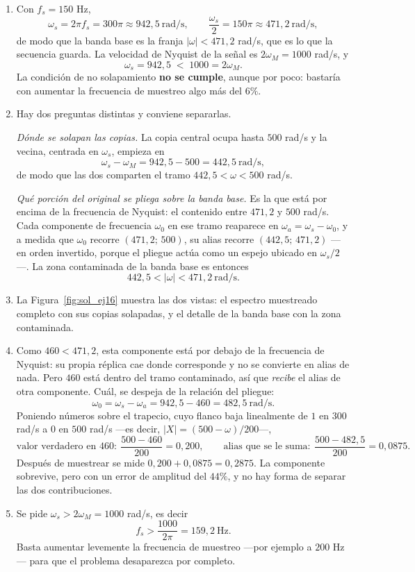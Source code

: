 \documentclass[10pt,a4paper]{article}
\begin{document}
	\begin{enumerate}
		\item Con $f_s = 150$ Hz,
		\[
			\omega_s = 2\pi f_s = 300\pi \approx 942{,}5 \ \text{rad/s},
			\qquad
			\frac{\omega_s}{2} = 150\pi \approx 471{,}2\ \text{rad/s},
		\]
		de modo que la banda base es la franja $|\omega| < 471{,}2$ rad/s, que es lo que la
		secuencia guarda. La velocidad de Nyquist de la señal es $2\omega_M = 1000$ rad/s, y
		\[
			\omega_s = 942{,}5 \;<\; 1000 = 2\omega_M .
		\]
		La condición de no solapamiento \textbf{no se cumple}, aunque por poco: bastaría con
		aumentar la frecuencia de muestreo algo más del $6\%$.

		\item Hay dos preguntas distintas y conviene
		separarlas.

		\emph{Dónde se solapan las copias.} La copia central ocupa hasta $500$ rad/s y la
		vecina, centrada en $\omega_s$, empieza en
		\[
			\omega_s - \omega_M = 942{,}5 - 500 = 442{,}5 \ \text{rad/s},
		\]
		de modo que las dos comparten el tramo $442{,}5 < \omega < 500$ rad/s.

		\emph{Qué porción del original se pliega sobre la banda base.} Es la que está por
		encima de la frecuencia de Nyquist: el contenido entre $471{,}2$ y $500$ rad/s. Cada
		componente de frecuencia $\omega_0$ en ese tramo reaparece en
		$\omega_a = \omega_s - \omega_0$, y a medida que $\omega_0$ recorre $(471{,}2;\,500)$,
		su alias recorre $(442{,}5;\,471{,}2)$ ---en orden invertido, porque el pliegue actúa
		como un espejo ubicado en $\omega_s/2$---. La zona contaminada de la banda base es
		entonces
		\[
			\boxed{\;442{,}5 < |\omega| < 471{,}2 \ \text{rad/s}.\;}
		\]

		\item La Figura~\ref{fig:sol_ej16} muestra las dos vistas: el
		espectro muestreado completo con sus copias solapadas, y el detalle de la banda base
		con la zona contaminada.

		\item Como $460 < 471{,}2$, esta
		componente está por debajo de la frecuencia de Nyquist: su propia réplica cae donde
		corresponde y no se convierte en alias de nada. Pero $460$ está dentro del tramo
		contaminado, así que \emph{recibe} el alias de otra componente. Cuál, se despeja de la
		relación del pliegue:
		\[
			\omega_0 = \omega_s - \omega_a = 942{,}5 - 460 = 482{,}5\ \text{rad/s}.
		\]
		Poniendo números sobre el trapecio, cuyo flanco baja linealmente de $1$ en $300$ rad/s
		a $0$ en $500$ rad/s ---es decir, $|X| = (500-\omega)/200$---,
		\[
			\text{valor verdadero en } 460: \ \frac{500-460}{200}=0{,}200,
			\qquad
			\text{alias que se le suma}: \ \frac{500-482{,}5}{200}=0{,}0875 .
		\]
		Después de muestrear se mide $0{,}200+0{,}0875 = 0{,}2875$. La componente sobrevive,
		pero con un error de amplitud del $44\%$, y no hay forma de separar las dos
		contribuciones.

		\item Se pide $\omega_s > 2\omega_M = 1000$
		rad/s, es decir
		\[
			f_s > \frac{1000}{2\pi} = 159{,}2\ \text{Hz}.
		\]
		Basta aumentar levemente la frecuencia de muestreo ---por ejemplo a $200$ Hz--- para que
		el problema desaparezca por completo.
	\end{enumerate}
\end{document}
